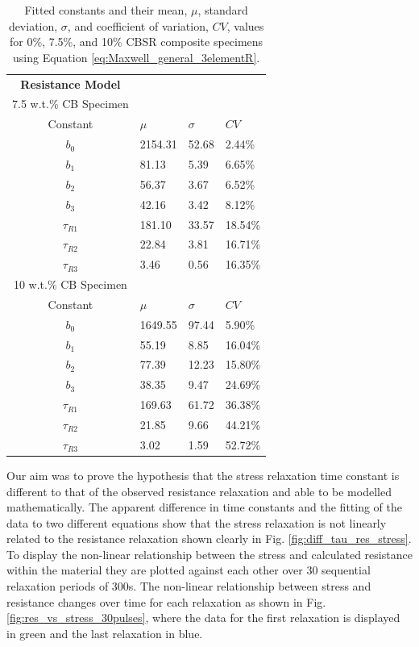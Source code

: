 \begin{table}[H]
	\caption{Fitted constants and their mean, $\mu$, standard deviation, $\sigma$, and coefficient of variation, $CV$, values for 0\%, 7.5\%, and 10\% CBSR composite specimens using Equation \ref{eq:Maxwell_general_3elementR}.}
	\begin{center}
		\label{tab:generalised_model_constants}
		\begin{tabular}{c l l l}
			\textbf{Resistance Model} \\
			7.5 w.t.\% CB Specimen \\
			\hline
			Constant & $\mu$ & $\sigma$ & $CV$ \\
			\hline
			$b_0$ & 2154.31 & 52.68 & 2.44\% \\
			$b_1$ & 81.13 & 5.39 & 6.65\% \\
			$b_2$ & 56.37 & 3.67 & 6.52\% \\
			$b_3$ & 42.16 & 3.42 & 8.12\% \\
			$\tau_{R1}$ & 181.10 & 33.57 & 18.54\% \\
			$\tau_{R2}$ & 22.84 & 3.81 & 16.71\% \\
			$\tau_{R3}$ & 3.46 & 0.56 & 16.35\% \\
			\hline
			10 w.t.\% CB Specimen \\
			Constant & $\mu$ & $\sigma$ & $CV$ \\
			\hline
			$b_0$ & 1649.55 & 97.44 & 5.90\% \\
			$b_1$ & 55.19 & 8.85 & 16.04\% \\
			$b_2$ & 77.39 & 12.23 & 15.80\% \\
			$b_3$ & 38.35 & 9.47 & 24.69\% \\
			$\tau_{R1}$ & 169.63 & 61.72 & 36.38\% \\
			$\tau_{R2}$ & 21.85 & 9.66 & 44.21\% \\
			$\tau_{R3}$ & 3.02 & 1.59 & 52.72\% \\
			\hline
		\end{tabular}
	\end{center}
\end{table}
Our aim was to prove the hypothesis that the stress relaxation time constant is different to that of the observed resistance relaxation and able to be modelled mathematically. The apparent difference in time constants and the fitting of the data to two different equations show that the stress relaxation is not linearly related to the resistance relaxation shown clearly in Fig. \ref{fig:diff_tau_res_stress}. To display the non-linear relationship between the stress and calculated resistance within the material they are plotted against each other over 30 sequential relaxation periods of 300s. The non-linear relationship between stress and resistance changes over time for each relaxation as shown in Fig. \ref{fig:res_vs_stress_30pulses}, where the data for the first relaxation is displayed in green and the last relaxation in blue.
